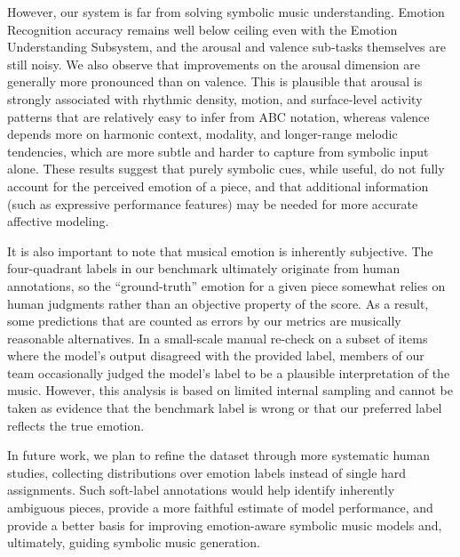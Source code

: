 \documentclass[sigconf]{acmart}
\begin{document}
However, our system is far from solving symbolic music understanding. Emotion Recognition accuracy remains well below ceiling even with the Emotion Understanding Subsystem, and the arousal and valence sub-tasks themselves are still noisy. We also observe that improvements on the arousal dimension are generally more pronounced than on valence. This is plausible that arousal is strongly associated with rhythmic density, motion, and surface-level activity patterns that are relatively easy to infer from ABC notation, whereas valence depends more on harmonic context, modality, and longer-range melodic tendencies, which are more subtle and harder to capture from symbolic input alone. These results suggest that purely symbolic cues, while useful, do not fully account for the perceived emotion of a piece, and that additional information (such as expressive performance features) may be needed for more accurate affective modeling.  

It is also important to note that musical emotion is inherently subjective. The four-quadrant labels in our benchmark ultimately originate from human annotations, so the “ground-truth” emotion for a given piece somewhat relies on human judgments rather than an objective property of the score. As a result, some predictions that are counted as errors by our metrics are musically reasonable alternatives. In a small-scale manual re-check on a subset of items where the model’s output disagreed with the provided label, members of our team occasionally judged the model’s label to be a plausible interpretation of the music. However, this analysis is based on limited internal sampling and cannot be taken as evidence that the benchmark label is wrong or that our preferred label reflects the true emotion. 

In future work, we plan to refine the dataset through more systematic human studies, collecting distributions over emotion labels instead of single hard assignments. Such soft-label annotations would help identify inherently ambiguous pieces, provide a more faithful estimate of model performance, and provide a better basis for improving emotion-aware symbolic music models and, ultimately, guiding symbolic music generation.
\end{document}

